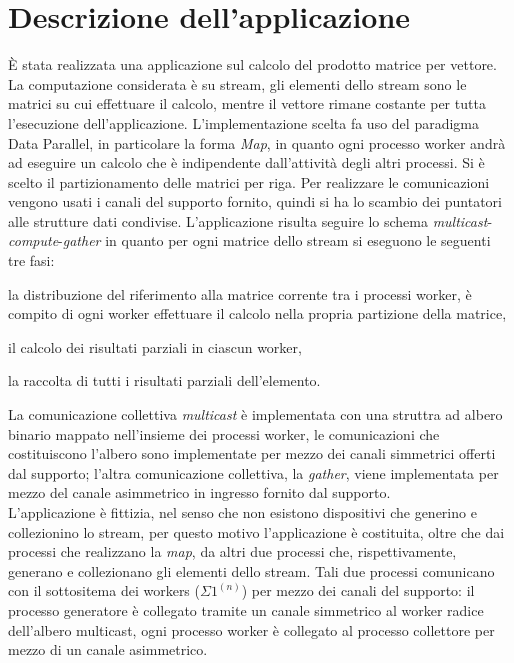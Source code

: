 \documentclass[a4paper]{article}
\newcommand{\subsystem}{$\Sigma1^{(n)}$}
\begin{document}
\section{Descrizione dell'applicazione}
\`E stata realizzata una applicazione sul calcolo del prodotto matrice per vettore. La computazione considerata \`e su stream, gli elementi dello stream sono le matrici su cui effettuare il calcolo, mentre il vettore rimane costante per tutta l'esecuzione dell'applicazione. 
L'implementazione scelta fa uso del paradigma Data Parallel, in particolare la forma \emph{Map}, in quanto ogni processo worker andr\`a ad eseguire un calcolo che \`e indipendente dall'attivit\`a degli altri processi. Si \`e scelto il partizionamento delle matrici per riga. 
Per realizzare le comunicazioni vengono usati i canali del supporto fornito, quindi si ha lo scambio dei puntatori alle strutture dati condivise. L'applicazione risulta seguire lo schema \emph{multicast}-\emph{compute}-\emph{gather} in quanto per ogni matrice dello stream si eseguono le seguenti tre fasi: 
\begin{compactenum} 
\item la distribuzione del riferimento alla matrice corrente tra i processi worker, \`e compito di ogni worker effettuare il calcolo nella propria partizione della matrice, 
\item il calcolo dei risultati parziali in ciascun worker, 
\item la raccolta di tutti i risultati parziali dell'elemento.
\end{compactenum}
La comunicazione collettiva \emph{multicast} \`e implementata con una struttra ad albero binario mappato nell'insieme dei processi worker, le comunicazioni che costituiscono l'albero sono implementate per mezzo dei canali simmetrici offerti dal supporto; l'altra comunicazione collettiva, la \emph{gather}, viene implementata per mezzo del canale asimmetrico in ingresso fornito dal supporto. \\
L'applicazione \`e fittizia, nel senso che non esistono dispositivi che generino e collezionino lo stream, per questo motivo l'applicazione \`e costituita, oltre che dai processi che realizzano la \emph{map}, da altri due processi che, rispettivamente, generano e collezionano gli elementi dello stream. 
Tali due processi comunicano con il sottositema dei workers (\subsystem) per mezzo dei canali del supporto: il processo generatore \`e collegato tramite un canale simmetrico al worker radice dell'albero multicast, ogni processo worker \`e collegato al processo collettore per mezzo di un canale asimmetrico.
\end{document}
